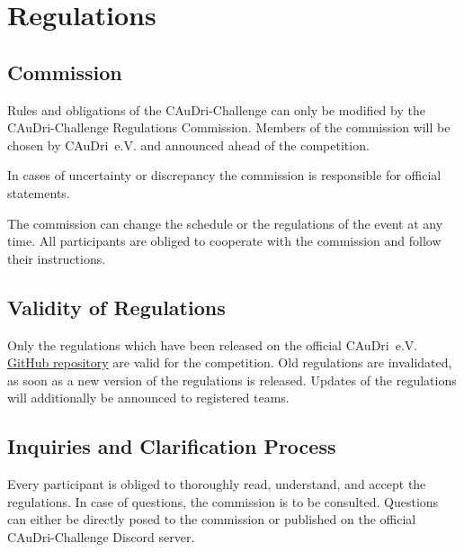 \chapter{Regulations}

\section{Commission}

Rules and obligations of the CAuDri-Challenge can only be modified by the CAuDri-Challenge Regulations Commission.
Members of the commission will be chosen by CAuDri~e.V. and announced ahead of the competition.

In cases of uncertainty or discrepancy the commission is responsible for official statements.

The commission can change the schedule or the regulations of the event at any time.
All participants are obliged to cooperate with the commission and follow their instructions.

\section{Validity of Regulations}

Only the regulations which have been released on the official CAuDri~e.V. \href{https://github.com/CAuDri/regulations/releases}{GitHub repository} are valid for the competition.
Old regulations are invalidated, as soon as a new version of the regulations is released.
Updates of the regulations will additionally be announced to registered teams.

\section{Inquiries and Clarification Process}

Every participant is obliged to thoroughly read, understand, and accept the regulations.
In case of questions, the commission is to be consulted.
Questions can either be directly posed to the commission or published on the official CAuDri-Challenge Discord server.